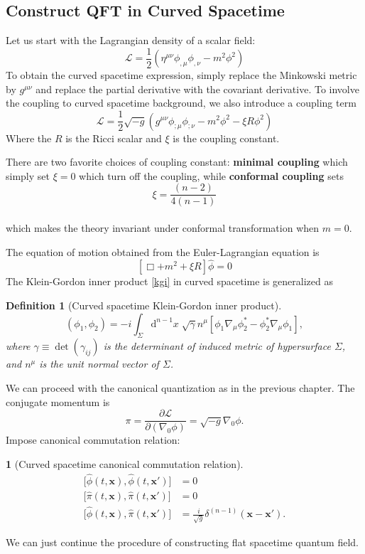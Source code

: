 \documentclass[12pt]{article}
\numberwithin{equation}{section}
\theoremstyle{1style}
\newtheorem{definition}[equation]{Definition}
\newtheorem{cthm}[equation]{}
\newcommand{\p}{\partial}
\newcommand{\id}{\mathrm{d}}
\begin{document}
\subsection{Construct QFT in Curved Spacetime}
Let us start with the Lagrangian density of a scalar field:
\[\mathcal{L} = \frac{1}{2}(\eta^{\mu\nu} \phi_{,\mu} \phi_{,\nu}- m^2 \phi^2)\]
To obtain the curved spacetime expression,
simply replace the Minkowski metric by \(g^{\mu\nu}\) and replace the partial derivative with the covariant derivative.
To involve the coupling to curved spacetime background, we also introduce a coupling term
\begin{equation}
  \mathcal{L} = \frac{1}{2}\sqrt{-g}(g^{\mu\nu} \phi_{;\mu} \phi_{;\nu}- m^2 \phi^2-\xi R \phi^2)
\end{equation}
Where the \(R\) is the Ricci scalar and \(\xi\) is the coupling constant.\par
There are two favorite choices of coupling constant:
\textbf{minimal coupling} which simply set \(\xi=0\) which turn off the coupling,
while \textbf{conformal coupling} sets \[\xi = \frac{(n-2)}{4(n-1)}\]\\
which makes the theory invariant under conformal transformation when \(m=0\).


The equation of motion obtained from the Euler-Lagrangian equation is
\begin{equation}
  \left[\Box+m^2+\xi R\right]\hat{\phi}=0
\end{equation}
The Klein-Gordon inner product \ref{kgi} in curved spacetime is generalized as
\begin{definition}[Curved spacetime Klein-Gordon inner product]
  \[(\phi_1,\phi_2)=-i\int_{\Sigma}\id^{n-1}x\;\sqrt{\gamma}n^{\mu}\left[\phi_1\nabla_\mu\phi^*_2-\phi_2^*\nabla_\mu\phi_1\right],\]
  where \(\gamma\equiv \det(\gamma_{ij})\) is the determinant of induced metric of hypersurface \(\Sigma\),
  and \(n^{\mu}\) is the unit normal vector of \(\Sigma\).
\end{definition}

We can proceed with the canonical quantization as in the previous chapter.
The conjugate momentum is
\begin{equation}
  \pi=\frac{\p \mathcal{L}}{\p(\nabla_{0}\phi)}=\sqrt{-g}\nabla_{0}\phi.
\end{equation}
Impose canonical commutation relation:
\begin{cthm}[Curved spacetime canonical commutation relation]\label{cccr}
  \begin{align*}
    \bigl[\hat{\phi}(t,\mathbf{x}),\hat{\phi}(t,\mathbf{x'})\bigr] & =0                                                         \\
    \bigl[\hat{\pi}(t,\mathbf{x}),\hat{\pi}(t,\mathbf{x'})\bigr]   & =0                                                         \\
    \bigl[\hat{\phi}(t,\mathbf{x}),\hat{\pi}(t,\mathbf{x'})\bigr]  & =\frac{i}{\sqrt{g}}\delta^{(n-1)}(\mathbf{x}-\mathbf{x'}).
  \end{align*}
\end{cthm}
We can just continue the procedure of constructing flat spacetime quantum field.
\end{document}
